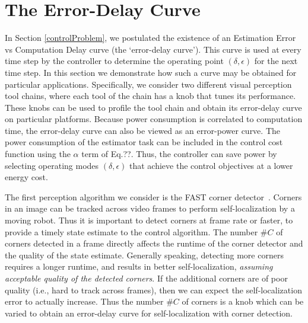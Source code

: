 \section{The Error-Delay Curve}
\label{delayErrorCurve}

In Section \ref{controlProblem}, we postulated the existence of an Estimation Error vs Computation Delay curve (the `error-delay curve').
This curve is used at every time step by the controller to determine the operating point $(\delta, \epsilon)$ for the next time step.
In this section we demonstrate how such a curve may be obtained for particular applications. 
Specifically, we consider two different visual perception tool chains, where each tool of the chain has a knob that tunes its performance.
These knobs can be used to profile the tool chain and obtain its error-delay curve on particular platforms.
Because power consumption is correlated to computation time, the error-delay curve can also be viewed as an error-power curve.
The power consumption of the estimator task can be included in the control cost function using the $\alpha$ term of Eq.??.
Thus, the controller can save power by selecting operating modes $(\delta,\epsilon)$ that achieve the control objectives at a lower energy cost.

The first perception algorithm we consider is the FAST corner detector~\cite{rosten_2006_machine}.
Corners in an image can be tracked across video frames to perform self-localization by a moving robot. 
Thus it is important to detect corners at frame rate or faster, to provide a timely state estimate to the control algorithm.
The number $\#C$ of corners detected in a frame directly affects the runtime of the corner detector and the quality of the state estimate.
Generally speaking, detecting more corners requires a longer runtime, and results in better self-localization, \emph{assuming acceptable quality of the detected corners}.
If the additional corners are of poor quality (i.e., hard to track across frames), then we can expect the self-localization error to actually increase.
Thus the number $\#C$ of corners is a knob which can be varied to obtain an error-delay curve for self-localization with corner detection. 

